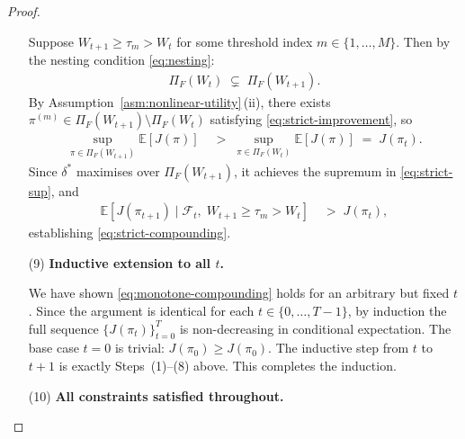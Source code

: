 \documentclass[12pt,openany]{book}
\newcommand{\calF}{\mathcal{F}}
\newcommand{\E}{\mathbb{E}}
\numberwithin{equation}{chapter}
\theoremstyle{plain}
\theoremstyle{definition}
\theoremstyle{remark}
\numberwithin{equation}{chapter}
\theoremstyle{plain}
\begin{document}
\begin{proof}
\begin{enumerate}
        Suppose $W_{t+1} \geq \tau_m > W_t$ for some threshold
        index $m \in \{1,\ldots,M\}$.  Then by the nesting
        condition \eqref{eq:nesting}:
        \begin{align}
          \Pi_F(W_t)
          \;\subsetneq\;
          \Pi_F(W_{t+1}).
          \label{eq:strict-nesting}
        \end{align}
        By Assumption~\ref{asm:nonlinear-utility}\,(ii), there
        exists $\pi^{(m)} \in \Pi_F(W_{t+1}) \setminus \Pi_F(W_t)$
        satisfying \eqref{eq:strict-improvement}, so
        \begin{align}
          \sup_{\pi \in \Pi_F(W_{t+1})}
          \E\!\left[J(\pi)\right]
          &\;>\;
          \sup_{\pi \in \Pi_F(W_t)}
          \E\!\left[J(\pi)\right]
          \;=\; J(\pi_t).
          \label{eq:strict-sup}
        \end{align}
        Since $\delta^*$ maximises over $\Pi_F(W_{t+1})$, it
        achieves the supremum in \eqref{eq:strict-sup}, and
        \begin{align}
          \E\!\left[J(\pi_{t+1}) \mid \calF_t,\;
          W_{t+1} \geq \tau_m > W_t\right]
          &\;>\; J(\pi_t),
          \label{eq:strict-conclusion}
        \end{align}
        establishing \eqref{eq:strict-compounding}.

  \item[\textup{(9)}] \textbf{Inductive extension to all $t$.}

        We have shown \eqref{eq:monotone-compounding} holds for
        an arbitrary but fixed $t$.  Since the argument is
        identical for each $t \in \{0,\ldots,T-1\}$, by induction
        the full sequence $\{J(\pi_t)\}_{t=0}^T$ is non-decreasing
        in conditional expectation.  The base case $t=0$ is
        trivial: $J(\pi_0) \geq J(\pi_0)$.  The inductive step
        from $t$ to $t+1$ is exactly Steps~(1)--(8) above.
        This completes the induction.

  \item[\textup{(10)}] \textbf{All constraints satisfied throughout.}


\end{enumerate}
\end{proof}
\end{document}

